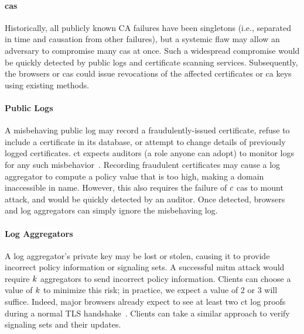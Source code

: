 \paragraph{\acp{ca}}
Historically, all publicly known CA failures have been singletons (i.e.,
separated in time and causation from other failures), but a systemic flaw may
allow an adversary to compromise many \acp{ca} at once. 
Such a widespread compromise would be quickly detected by public
logs and certificate scanning services. Subsequently, the browsers or \acp{ca}
could issue revocations of the affected certificates or \ac{ca} keys using
existing methods.

\paragraph{Public Logs}
A misbehaving public log may record a fraudulently-issued certificate, refuse
to include a certificate in its database, or attempt to change details of
previously logged certificates. \ac{ct} expects auditors (a role anyone can adopt) to
monitor logs for any such misbehavior~\cite{rfc6962}. 
Recording fraudulent certificates may cause a log
aggregator to compute a policy value that is too high, making a domain
inaccessible in \ac{name}. However, this also requires the failure of $c$
\acp{ca} to mount  attack, and would be quickly detected by an
auditor. Once detected, browsers and log aggregators can simply ignore the
misbehaving log.

\paragraph{Log Aggregators}
A log aggregator's private key may be lost or stolen, causing it to provide
incorrect policy information or signaling sets. A successful \ac{mitm} attack
would require $k$ aggregators to send incorrect policy information.
Clients can choose a value of $k$ to minimize this risk;
in practice, we expect a value of 2 or 3 will suffice.
Indeed, major browsers already
expect to see at least two \ac{ct} log proofs during a normal TLS handshake~\cite{apple2019apples}.
Clients can take a similar approach to verify signaling sets and their updates.

